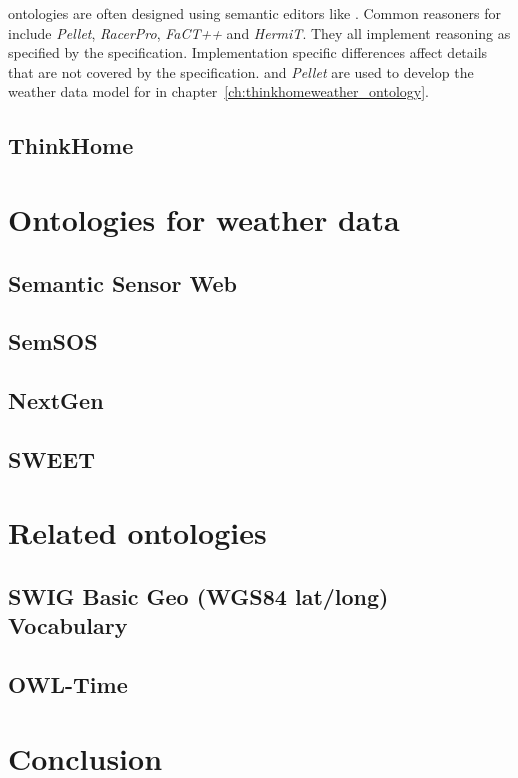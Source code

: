 
 ontologies are often designed using semantic editors like \protege. Common reasoners for  include \emph{Pellet}, \emph{RacerPro}, \emph{FaCT++} and \emph{HermiT}. They all implement reasoning as specified by the  specification. Implementation specific differences affect details that are not covered by the  specification. \protege and \emph{Pellet} are used to develop the weather data model for \thinkhome in chapter~\ref{ch:thinkhomeweather_ontology}.


\subsection{ThinkHome}


\section{Ontologies for weather data}


\subsection{Semantic Sensor Web}


\subsection{SemSOS}


\subsection{NextGen}


\subsection{SWEET}


\section{Related ontologies}


\subsection{SWIG Basic Geo (WGS84 lat/long) Vocabulary}


\subsection{OWL-Time}



\section{Conclusion}
